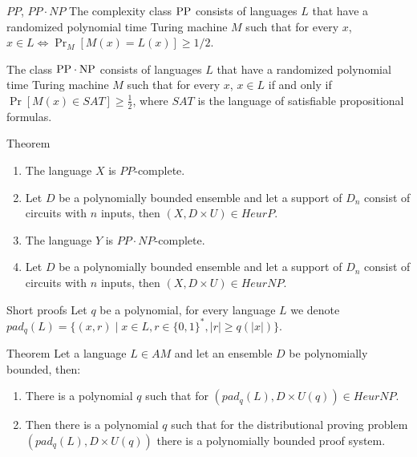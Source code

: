 \begin{frame}{}
\begin{columns}[t]
\begin{column}{0.32\linewidth}
        \begin{block}{$PP$, $PP \cdot NP$}
            The complexity class $\rm PP$ consists of languages $L$ that 
            have a randomized polynomial time Turing machine $M$ such that for every
            $x$, $x \in L \iff \Pr_M[M(x) = L(x)] \ge 1 / 2$.

            The class $\rm PP \cdot NP$ consists of languages $L$ that have a
			randomized polynomial time Turing machine $M$ such that for every $x$,
            $x \in L$ if and only if $\Pr[M(x)\in SAT]\ge \frac12$, where $SAT$ is
            the language of satisfiable propositional formulas.
        \end{block}

        \begin{alertblock}{Theorem}
        	\begin{enumerate}
				\item The language $X$ is $PP$-complete.
		    	\item Let $D$ be a polynomially bounded ensemble and let a
				    support of $D_n$ consist of circuits with $n$ inputs, then 
		            $(X, D \times U) \in HeurP$.
                \item The language $Y$ is $PP \cdot NP$-complete.
		    	\item Let $D$ be a polynomially bounded ensemble and let a
				    support of $D_n$ consist of circuits with $n$ inputs, then
		            $(X, D \times U) \in HeurNP$.
		    \end{enumerate}
        \end{alertblock}

        \begin{block}{Short proofs}
            Let $q$ be a polynomial, for every language $L$ we denote $pad_q(L) = 
			\{(x, r) \mid x \in L, r \in \{0, 1\}^* , |r| \ge q(|x|)\}$.
        \end{block}

        \begin{alertblock}{Theorem}
            Let a language $L \in AM$ and let an ensemble $D$ be polynomially 
		    bounded, then:
		    \begin{enumerate}
    			\item There is a polynomial $q$ such that for $(pad_q(L),
				    D \times U(q)) \in HeurNP$.
        		\item Then there is a polynomial $q$ such that for the distributional
		            proving problem $(pad_q(L), D \times U(q))$ 
        		    there is a polynomially bounded proof system.
		    \end{enumerate}
        \end{alertblock}


        \begin{block}{}
        	    
        \end{block}
    \end{column}%

\end{columns}

\end{frame}

